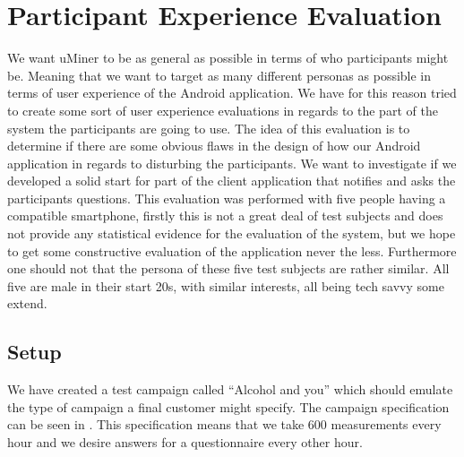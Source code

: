 \section{Participant Experience Evaluation}
\label{sec:participant_experience_evaluation}

We want uMiner to be as general as possible in terms of who participants might be. Meaning that we want to target as many different personas as possible in terms of user experience of the Android application. We have for this reason tried to create some sort of user experience evaluations in regards to the part of the system the participants are going to use. The idea of this evaluation is to determine if there are some obvious flaws in the design of how our Android application in regards to disturbing the participants. We want to investigate if we developed a solid start for part of the client application that notifies and asks the participants questions. This evaluation was performed with five people having a compatible smartphone, firstly this is not a great deal of test subjects and does not provide any statistical evidence for the evaluation of the system, but we hope to get some constructive evaluation of the application never the less. Furthermore one should not that the persona of these five test subjects are rather similar. All five are male in their start 20s, with similar interests, all being tech savvy some extend.

\subsection{Setup}
\label{sub:setup}

We have created a test campaign called ``Alcohol and you'' which should emulate the type of campaign a final customer might specify. The campaign specification can be seen in . This specification means that we take 600 measurements every hour and we desire answers for a questionnaire every other hour.

